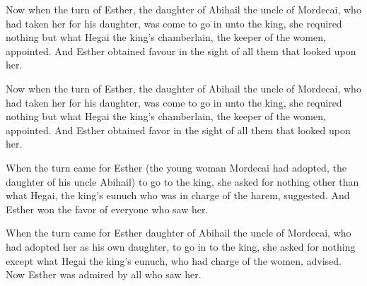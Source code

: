 			Now when the turn of Esther, the daughter of Abihail the uncle of Mordecai, who had taken her for his daughter, was come to go in unto the king, she required nothing but what Hegai the king’s chamberlain, the keeper of the women, appointed. And Esther obtained favour in the sight of all them that looked upon her.

			\begin{versebox}
					\item[BHS] 
					\item[LXX] 
					\item[ASV] Now when the turn of Esther, the daughter of Abihail the uncle of Mordecai, who had taken her for his daughter, was come to go in unto the king, she required nothing but what Hegai the king's chamberlain, the keeper of the women, appointed. And Esther obtained favor in the sight of all them that looked upon her.
					\item[NIV] When the turn came for Esther (the young woman Mordecai had adopted, the daughter of his uncle Abihail) to go to the king, she asked for nothing other than what Hegai, the king’s eunuch who was in charge of the harem, suggested. And Esther won the favor of everyone who saw her.
					\item[NRSV] When the turn came for Esther daughter of Abihail the uncle of Mordecai, who had adopted her as his own daughter, to go in to the king, she asked for nothing except what Hegai the king’s eunuch, who had charge of the women, advised. Now Esther was admired by all who saw her.
			\end{versebox}

